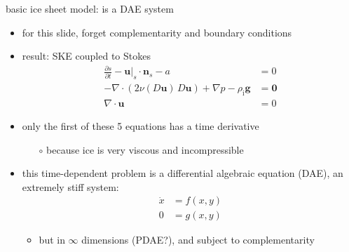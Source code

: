 \documentclass[svgnames,
               hyperref={colorlinks,citecolor=DeepPink4,linkcolor=FireBrick,urlcolor=Maroon},
               usepdftitle=false]  %
               {beamer}
\newcommand{\bn}{\mathbf{n}}
\newcommand{\bu}{\mathbf{u}}
\newcommand{\bzero}{\bm{0}}
\newcommand{\rhoi}{\rho_{\text{i}}}
\begin{document}
\begin{frame}{basic ice sheet model: is a DAE system}

\begin{itemize}
\item for this slide, forget complementarity and boundary conditions
\item result: SKE coupled to Stokes
\begin{align*}
\frac{\partial s}{\partial t} - \bu|_s \cdot \bn_s - a &= 0 \\
- \nabla \cdot \left(2 \nu(D\bu)\, D\bu\right) + \nabla p - \rhoi \mathbf{g} &= \bzero \\
\nabla \cdot \bu &= 0
\end{align*}

\item only the first of these 5 equations has a time derivative
    \begin{itemize}
    \item[$\circ$] because ice is very viscous and incompressible
    \end{itemize}
\item<2> this time-dependent problem is a \alert{differential algebraic equation} (DAE), an extremely stiff system:
\begin{align*}
\dot x &= f(x,y) \\
     0 &= g(x,y)
\end{align*}

    \begin{itemize}
    \item<2>[$\circ$] but in $\infty$ dimensions (PDAE?), and subject to complementarity
    \end{itemize}
\end{itemize}
\end{frame}
\end{document}
